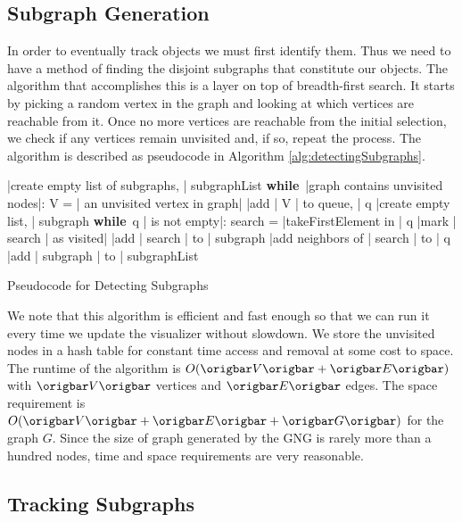 \documentclass{article}
\renewcommand{\|}{\origbar} %
\renewcommand{\WHILE}{\mbox{{\bf while} }\tab}
\begin{document}
\subsection{Subgraph Generation}

In order to eventually track objects we must first identify them. Thus we need to have a method of finding the disjoint subgraphs that constitute our objects. The algorithm that accomplishes this is a layer on top of breadth-first search. It starts by picking a random vertex in the graph and looking at which vertices are reachable from it. Once no more vertices are reachable from the initial selection, we check if any vertices remain unvisited and, if so, repeat the process. The algorithm is described as pseudocode in Algorithm \ref{alg:detectingSubgraphs}.

\begin{Algorithm}[h!]
\begin{program}
  |create empty list of subgraphs, | subgraphList 
  \WHILE |graph contains unvisited nodes|:
    V = | an unvisited vertex in graph|
    |add | V | to queue, | q
    |create empty list, | subgraph 
    \WHILE q | is not empty|:
      search = |takeFirstElement in | q 
      |mark | search | as visited|
      |add | search | to | subgraph
      |add neighbors of | search | to | q \untab
  |add | subgraph | to | subgraphList
\end{program}
\caption{Pseudocode for Detecting Subgraphs}
\label{alg:detectingSubgraphs}
\end{Algorithm}

We note that this algorithm is efficient and fast enough so that we can run it every time we update the visualizer without slowdown. We store the unvisited nodes in a hash table for constant time access and removal at some cost to space. The runtime of the algorithm is $O(\|V\|+\|E\|)$ with $\|V\|$ vertices and $\|E\|$ edges. The space requirement is $O(\|V\|+\|E\|+\|G\|)$ for the graph $G$. Since the size of graph generated by the GNG is rarely more than a hundred nodes, time and space requirements are very reasonable.

\subsection{Tracking Subgraphs}
\end{document}

